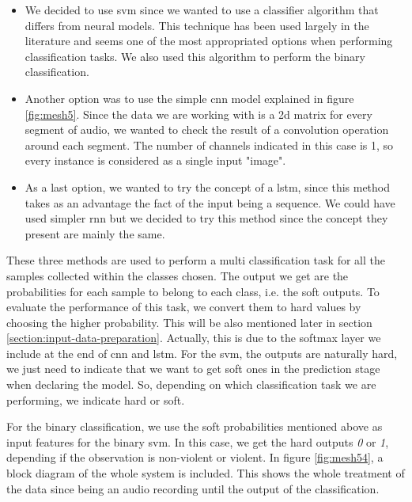 	\begin{itemize}
		\item We decided to use \acrshort{svm} since we wanted to use a classifier algorithm that differs from neural models. This technique has been used largely in the literature \cite{Fu2011} and seems one of the most appropriated options when performing classification tasks. We also used this algorithm to perform the binary classification.
		\item Another option was to use the simple \acrshort{cnn} model explained in figure \ref{fig:mesh5}. Since the data we are working with is a 2\acrshort{d} matrix for every segment of audio, we wanted to check the result of a convolution operation around each segment. The number of channels indicated in this case is 1, so every instance is considered as a single input "image".
		\item As a last option, we wanted to try the concept of a \acrshort{lstm}, since this method takes as an advantage the fact of the input being a sequence. We could have used simpler \acrshort{rnn} but we decided to try this method since the concept they present are mainly the same.
	\end{itemize}
	
	These three methods are used to perform a multi classification task for all the samples collected within the classes chosen. The output we get are the probabilities for each sample to belong to each class, i.e. the soft outputs. To evaluate the performance of this task, we convert them to hard values by choosing the higher probability. This will be also mentioned later in section \ref{section:input-data-preparation}. Actually, this is due to the softmax layer we include at the end of \acrshort{cnn} and \acrshort{lstm}. For the \acrshort{svm}, the outputs are naturally hard, we just need to indicate that we want to get soft ones in the prediction stage when declaring the model. So, depending on which classification task we are performing, we indicate hard or soft.
	
	For the binary classification, we use the soft probabilities mentioned above as input features for the binary \acrshort{svm}. In this case, we get the hard outputs \textit{0} or \textit{1}, depending if the observation is non-violent or violent. In figure \ref{fig:mesh54}, a block diagram of the whole system is included. This shows the whole treatment of the data since being an audio recording until the output of the classification.
	
